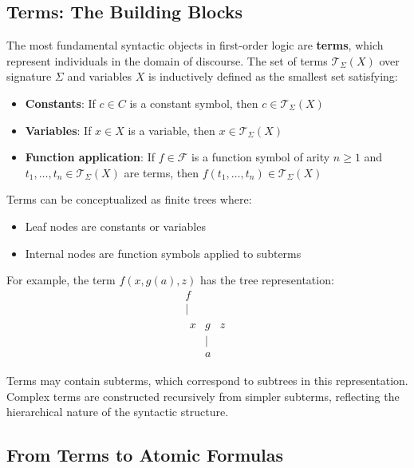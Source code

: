\documentclass[11pt,a4paper]{article}
\theoremstyle{definition}
\theoremstyle{plain}
\theoremstyle{remark}
\begin{document}
\subsection{Terms: The Building Blocks}

The most fundamental syntactic objects in first-order logic are \textbf{terms}, which represent individuals in the domain of discourse. The set of terms $\mathcal{T}_\Sigma(X)$ over signature $\Sigma$ and variables $X$ is inductively defined as the smallest set satisfying:

\begin{itemize}
    \item \textbf{Constants}: If $c \in C$ is a constant symbol, then $c \in \mathcal{T}_\Sigma(X)$
    \item \textbf{Variables}: If $x \in X$ is a variable, then $x \in \mathcal{T}_\Sigma(X)$
    \item \textbf{Function application}: If $f \in \mathcal{F}$ is a function symbol of arity $n \geq 1$ and $t_1, \dots, t_n \in \mathcal{T}_\Sigma(X)$ are terms, then $f(t_1, \dots, t_n) \in \mathcal{T}_\Sigma(X)$
\end{itemize}

Terms can be conceptualized as finite trees where:
\begin{itemize}
    \item Leaf nodes are constants or variables
    \item Internal nodes are function symbols applied to subterms
\end{itemize}

For example, the term $f(x, g(a), z)$ has the tree representation:
\[
\begin{array}{c}
  f \\
  | \\
  \begin{array}{ccc}
    x & g & z \\
       & | & \\
       & a &
  \end{array}
\end{array}
\]


Terms may contain subterms, which correspond to subtrees in this representation. Complex terms are constructed recursively from simpler subterms, reflecting the hierarchical nature of the syntactic structure.

\subsection{From Terms to Atomic Formulas}
\end{document}
